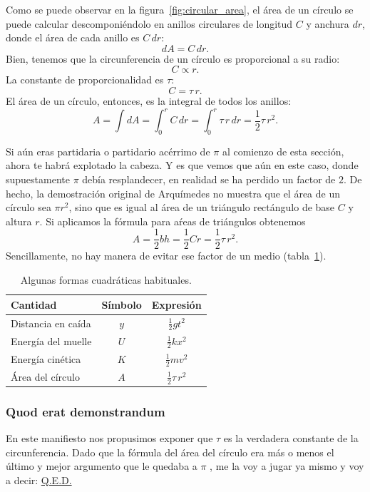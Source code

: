Como se puede observar en la figura~\ref{fig:circular_area}, el área de un círculo se puede calcular descomponiéndolo en anillos circulares de longitud $C$ y anchura $dr$, donde el área de cada anillo es $C\,dr$:
\[ dA = C\,dr. \]
Bien, tenemos que la circunferencia de un círculo es proporcional a su radio:
\[ C \propto r. \]
La constante de proporcionalidad es $\tau$:
\[ C = \tau\,r. \]
El área de un círculo, entonces, es la integral de todos los anillos:
\[ A = \int dA = \int_0^r C\,dr = \int_0^r \tau\,r\,dr = \textstyle{\frac{1}{2}} \tau\,r^2. \]

Si aún eras partidaria o partidario acérrimo de  $\pi$ al comienzo de esta sección, ahora te habrá explotado la cabeza. Y es que vemos que aún en este caso, donde supuestamente $\pi$ debía resplandecer, en realidad se ha perdido un factor de $2$. De hecho, la demostración original de Arquímedes no muestra que el área de un círculo sea $\pi r^2$, sino que es igual al área de un triángulo rectángulo de base $C$ y altura $r$. Si aplicamos la fórmula para aŕeas de triángulos obtenemos
\[
  A = \textstyle{\frac{1}{2}} bh = \textstyle{\frac{1}{2}}Cr = \textstyle{\frac{1}{2}}\tau\,r^2.
\]
Sencillamente, no hay manera de evitar ese factor de un medio (tabla~\ref{table:quadratic_forms}).

\begin{table}
\begin{center}
\begin{tabular}{lcc}
Cantidad & Símbolo & Expresión \\ \hline
Distancia en caída & $y$ & $\textstyle{\frac{1}{2}}gt^2$ \smallskip \\
Energía del muelle & $U$ & $\textstyle{\frac{1}{2}}kx^2$ \smallskip \\
Energía cinética & $K$ & $\textstyle{\frac{1}{2}}mv^2$ \smallskip \\
Área del círculo & $A$ & $\textstyle{\frac{1}{2}}\tau\,r^2$
\end{tabular}
\end{center}
\caption{Algunas formas cuadráticas habituales.\label{table:quadratic_forms}}
\end{table}

    \subsubsection{Quod erat demonstrandum} %
    \label{sec:quod_erat_demonstrandum}

En este manifiesto nos propusimos exponer que $\tau$ es la verdadera constante de la circunferencia. Dado que la fórmula del área del círculo era más o menos el último y mejor argumento que le quedaba a $\pi$ , me la voy a jugar ya mismo y voy a decir: \href{https://es.wikipedia.org/wiki/Quod_erat_demonstrandum}{Q.E.D.}

